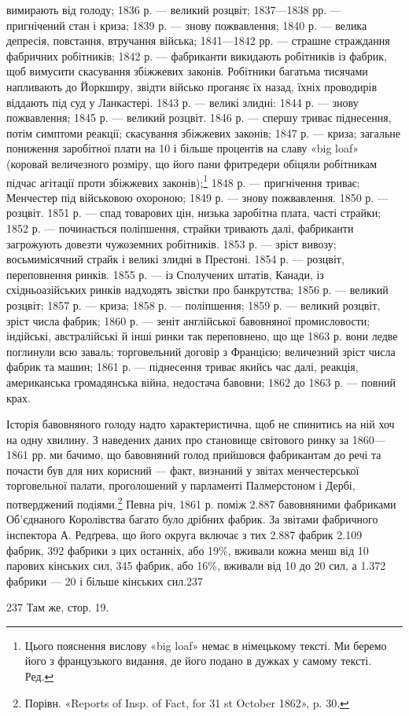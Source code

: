 вимирають від голоду; 1836 р. — великий розцвіт; 1837—1838 рр. —
пригнічений стан і криза; 1839 р. — знову пожвавлення; 1840 р. —
велика депресія, повстання, втручання війська; 1841—1842 рр. —
страшне страждання фабричних робітників; 1842 р. — фабриканти
викидають робітників із фабрик, щоб вимусити скасування збіжжевих
законів. Робітники багатьма тисячами напливають до
Йоркширу, звідти військо проганяє їх назад, їхніх проводирів
віддають під суд у Ланкастері. 1843 р. — великі злидні: 1844 р. —
знову пожвавлення; 1845 р. — великий розцвіт. 1846 р. — спершу
триває піднесення, потім симптоми реакції; скасування збіжжевих
законів; 1847 р. — криза; загальне пониження заробітної плати
на 10 і більше процентів на славу «big loaf» (коровай величезного
розміру, що його пани фритредери обіцяли робітникам підчас
агітації проти збіжжевих законів);\footnote*{
Цього пояснення вислову «big loaf» немає в німецькому тексті.
Ми беремо його з французького видання, де його подано в дужках у самому
тексті. Ред.
} 1848 р. — пригнічення триває;
Менчестер під військовою охороною; 1849 р. — знову пожвавлення.
1850 р. — розцвіт. 1851 р. — спад товарових цін, низька
заробітна плата, часті страйки; 1852 р. — починається поліпшення,
страйки тривають далі, фабриканти загрожують довезти чужоземних
робітників. 1853 р. — зріст вивозу; восьмимісячний страйк
і великі злидні в Престоні. 1854 р. — розцвіт, переповнення ринків.
1855 р. — із Сполучених штатів, Канади, із східньоазійських
ринків надходять звістки про банкрутства; 1856 р. — великий
розцвіт; 1857 р. — криза; 1858 р. — поліпшення; 1859 р. — великий
розцвіт, зріст числа фабрик; 1860 р. — зеніт англійської
бавовняної промисловости; індійські, австралійські й інші ринки
так переповнено, що ще 1863 р. вони ледве поглинули всю заваль;
торговельний договір з Францією; величезний зріст числа фабрик
та машин; 1861 р. — піднесення триває якийсь час далі, реакція,
американська громадянська війна, недостача бавовни; 1862 до
1863 р. — повний крах.

Історія бавовняного голоду надто характеристична, щоб не
спинитись на ній хоч на одну хвилину. З наведених даних про
становище світового ринку за 1860—1861 рр. ми бачимо, що
бавовняний голод прийшовся фабрикантам до речі та почасти був
для них корисний — факт, визнаний у звітах менчестерської
торговельної палати, проголошений у парламенті Палмерстоном
і Дербі, потверджений подіями.\footnote{
Порівн. «Reports of Insp. of Fact, for 31 st October 1862», p. 30.
} Певна річ, 1861 р.
поміж 2.887 бавовняними фабриками Об’єднаного Королівства
багато було дрібних фабрик. За звітами фабричного інспектора
А. Редґрева, що його округа включає з тих 2.887 фабрик 2.109 фабрик,
392 фабрики з цих останніх, або 19\%, вживали кожна
менш від 10 парових кінських сил, 345 фабрик, або 16\%, вживали
від 10 до 20 сил, а 1.372 фабрики — 20 і більше кінських сил.237

237 Там же, стор. 19.